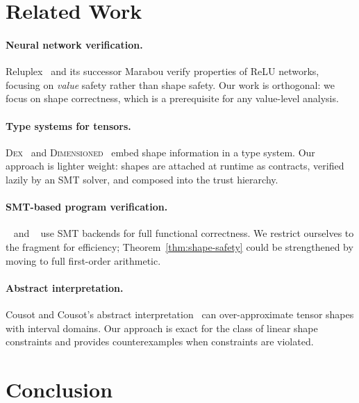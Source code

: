 \documentclass[11pt]{article}
\begin{document}
\section{Related Work}
\label{sec:related}

\paragraph{Neural network verification.}
Reluplex~\cite{reluplex} and its successor Marabou verify properties
of ReLU networks, focusing on \emph{value} safety rather than shape
safety.  Our work is orthogonal: we focus on shape correctness, which
is a prerequisite for any value-level analysis.

\paragraph{Type systems for tensors.}
\textsc{Dex}~\cite{dex} and \textsc{Dimensioned}~\cite{dimtypes}
embed shape information in a type system.  Our approach is lighter
weight: shapes are attached at runtime as contracts, verified
lazily by an SMT solver, and composed into the \JuGeo{} trust
hierarchy.

\paragraph{SMT-based program verification.}
\Dafny{}~\cite{dafny} and \Fstar{}~\cite{fstar} use SMT backends for
full functional correctness.  We restrict ourselves to the \QFLIA{}
fragment for efficiency; Theorem~\ref{thm:shape-safety} could be
strengthened by moving to full first-order arithmetic.

\paragraph{Abstract interpretation.}
Cousot and Cousot's abstract interpretation~\cite{cousot77} can
over-approximate tensor shapes with interval domains.  Our approach
is exact for the class of linear shape constraints and provides
counterexamples when constraints are violated.

\section{Conclusion}
\label{sec:conclusion}
\end{document}
